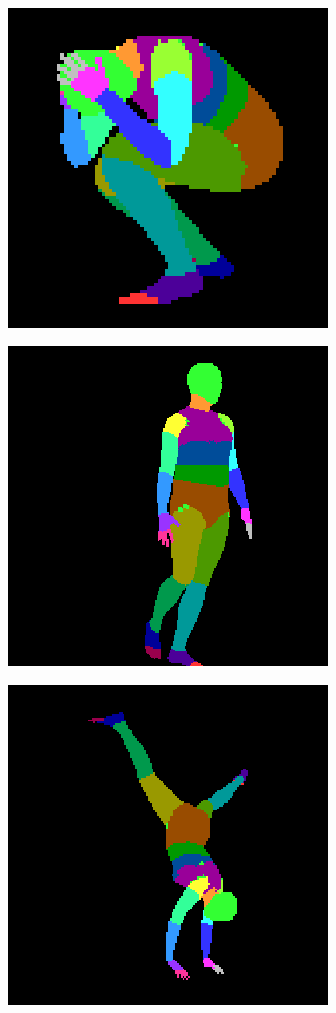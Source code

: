 \documentclass{beamer}
\begin{document}
\begin{frame}
\begin{figure}
\begin{subfigure}{.3\textwidth}
\end{subfigure}\\
\begin{subfigure}{.3\textwidth}
  \centering
  \includegraphics[scale=0.25]{ung_77_09_c0001_segm_67.png}
\end{subfigure}
\begin{subfigure}{.3\textwidth}
  \centering
  \includegraphics[scale=0.25]{ung_91_62_c0003_segm_87.png}
\end{subfigure}
\begin{subfigure}{.3\textwidth}
  \centering
  \includegraphics[scale=0.25]{ung_144_02_c0006_segm_2.png}
\end{subfigure}


\end{figure}
\end{frame}
\end{document}
